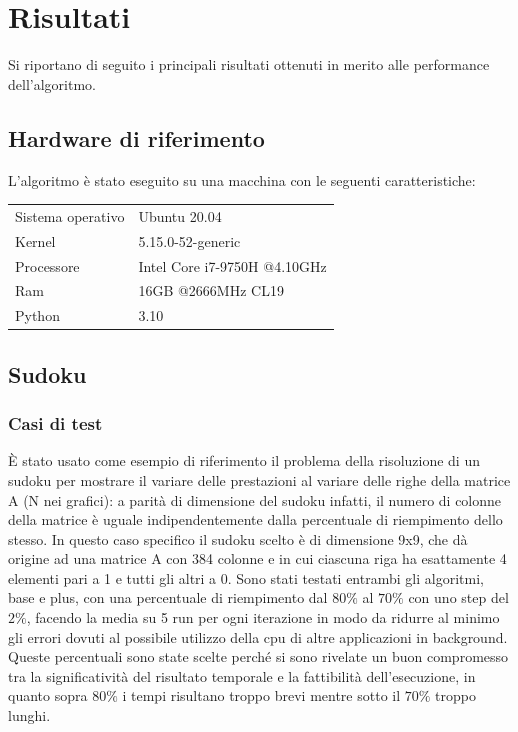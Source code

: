 \chapter{Risultati}
Si riportano di seguito i principali risultati ottenuti in merito alle performance dell'algoritmo. 


\section{Hardware di riferimento}
L'algoritmo è stato eseguito su una macchina con le seguenti caratteristiche:

\begin{tabular}{>{\hspace{1em}}l l}
Sistema operativo & Ubuntu 20.04\\
Kernel & 5.15.0-52-generic\\
Processore & Intel Core i7-9750H @4.10GHz\\         
Ram & 16GB @2666MHz CL19\\
Python & 3.10\\
\end{tabular}

\section{Sudoku}

\subsection{Casi di test}
È stato usato come esempio di riferimento il problema della risoluzione di un sudoku per mostrare il variare delle prestazioni al variare delle righe della matrice A (N nei grafici): a parità di dimensione del sudoku infatti, il numero di colonne della matrice è uguale indipendentemente dalla percentuale di riempimento dello stesso. In questo caso specifico il sudoku scelto è di dimensione 9x9, che dà origine ad una matrice A con 384 colonne e in cui ciascuna riga ha esattamente 4 elementi pari a 1 e tutti gli altri a 0. Sono stati testati entrambi gli algoritmi, base e plus, con una percentuale di riempimento dal $80\%$ al $70\%$ con uno step del $2\%$, facendo la media su 5 run per ogni iterazione in modo da ridurre al minimo gli errori dovuti al possibile utilizzo della cpu di altre applicazioni in background. Queste percentuali sono state scelte perché si sono rivelate un buon compromesso tra la significatività del risultato temporale e la fattibilità dell'esecuzione, in quanto sopra $80\%$ i tempi risultano troppo brevi mentre sotto il $70\%$ troppo lunghi.

